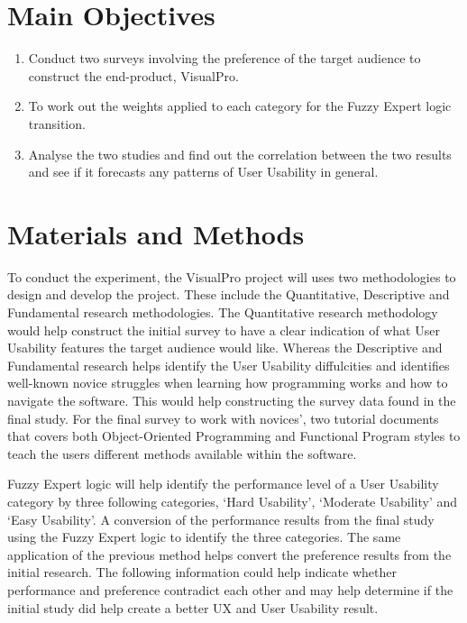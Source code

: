 \documentclass[a0,portrait]{a0poster}
\begin{document}
\begin{multicols}{2}
\section*{Main Objectives}

\begin{enumerate}
\item Conduct two surveys involving the preference of the target audience to construct the end-product, VisualPro.
\item To work out the weights applied to each category for the Fuzzy Expert logic transition.
\item Analyse the two studies and find out the correlation between the two results and see if it forecasts any patterns of User Usability in general.
\end{enumerate}


\section*{Materials and Methods}
To conduct the experiment, the VisualPro project will uses two methodologies to design and develop the project. These include the Quantitative, Descriptive and Fundamental research methodologies. The Quantitative research methodology would help construct the initial survey to have a clear indication of what User Usability features the target audience would like. Whereas the Descriptive and Fundamental research helps identify the User Usability diffulcities and identifies well-known novice struggles when learning how programming works and how to navigate the software. This would help constructing the survey data found in the final study. For the final survey to work with novices', two tutorial documents that covers both Object-Oriented Programming and Functional Program styles to teach the users different methods available within the software.

Fuzzy Expert logic will help identify the performance level of a User Usability category by three following categories, `Hard Usability', `Moderate Usability' and `Easy Usability'. A conversion of the performance results from the final study using the Fuzzy Expert logic to identify the three categories. The same application of the previous method helps convert the preference results from the initial research. The following information could help indicate whether performance and preference contradict each other and may help determine if the initial study did help create a better UX and User Usability result.


\end{multicols}
\end{document}
